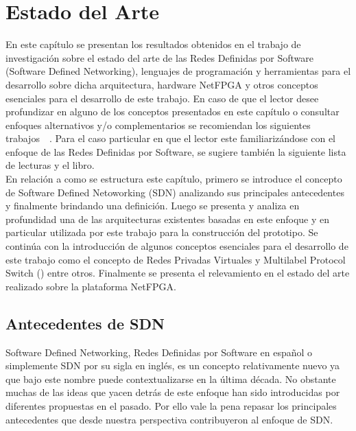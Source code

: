 
\chapter{Estado del Arte}  %

\ifpdf
    \graphicspath{{Chapter2/Figs/Raster/}{Chapter2/Figs/PDF/}{Chapter2/Figs/}}
\else
    \graphicspath{{Chapter2/Figs/Vector/}{Chapter2/Figs/}}
\fi

En este capítulo se presentan los resultados obtenidos en el trabajo de investigación sobre el estado
del arte de las Redes Definidas por Software (Software Defined Networking), lenguajes
de programación y herramientas para el desarrollo sobre dicha arquitectura, hardware NetFPGA y otros conceptos esenciales para el desarrollo de este trabajo. En caso de que el lector desee profundizar en alguno de los conceptos presentados en este cap\'itulo o consultar enfoques alternativos
y/o complementarios se recomiendan los siguientes trabajos~\citep{StateOfArt1}~\citep{StateOfArt2}. Para el caso particular en que el lector este familiarizándose con el enfoque de las Redes Definidas por Software, se sugiere también la siguiente lista de lecturas\citep{SDNReadingList} y el libro\citep{SDNBook1}.\\

En relación a como se estructura este cap\'itulo, primero se introduce el concepto de Software Defined Netoworking (SDN) analizando sus principales antecedentes y finalmente brindando una definición. Luego se presenta y analiza en profundidad una de las arquitecturas existentes basadas en este enfoque y en particular utilizada por este trabajo para la construcción del prototipo. Se contin\'ua con la introducción de algunos conceptos esenciales para el desarrollo de este trabajo como el concepto de Redes Privadas Virtuales y Multilabel Protocol Switch () entre otros. Finalmente se presenta el relevamiento en el estado del arte realizado sobre la plataforma NetFPGA.  

\section{Antecedentes de SDN} %
Software Defined Networking, Redes Definidas por Software en español o simplemente SDN por su sigla en ingl\'es, es un concepto relativamente nuevo ya que bajo este nombre puede contextualizarse en la \'ultima década. No obstante muchas de las ideas que yacen detrás de este enfoque han sido introducidas por diferentes propuestas en el pasado. Por ello vale la pena repasar los principales antecedentes que desde nuestra perspectiva contribuyeron al enfoque de SDN. 

